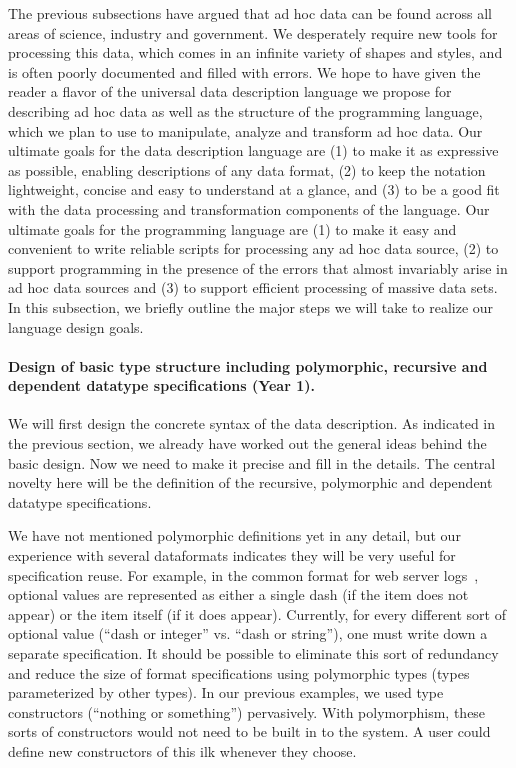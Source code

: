 \documentclass[11pt]{article}
\begin{document}
The previous subsections have argued
that ad hoc data can be found across all areas of science,
industry and government.  We desperately require new tools for processing
this data, which comes in an infinite variety of shapes and styles,
and is often poorly documented and filled with errors.  We hope to
have given the reader a flavor of the
universal data description language we propose for describing
ad hoc data as well as the structure of
the \datatype{} programming language, which we plan to use to
manipulate, analyze and transform ad hoc data.
Our ultimate goals for the data description language are (1) to make it
as expressive as possible, enabling descriptions of
any data format, (2) to keep the notation lightweight, 
concise and easy to understand at a glance, and (3)
to be a good fit with the data processing and
transformation components of the \datatype{} language.
Our ultimate goals for the \datatype{} programming language
are (1) to make it easy and convenient to write reliable
scripts for processing any ad hoc data source, (2)
to support programming in the presence of the errors that
almost invariably arise in ad hoc data sources and (3)
to support efficient processing of massive data sets.
In this subsection, we briefly outline the major steps
we will take to realize our language design goals.

\paragraph*{Design of basic type structure including 
polymorphic, recursive and dependent datatype specifications (Year 1).}
We will first design the concrete syntax of the data description.
As indicated in the previous section, we already have worked
out the general ideas behind the basic design.  Now we need to make 
it precise and fill in the details.  The central novelty
here will be the definition of the recursive, polymorphic
and dependent datatype specifications.

We have not mentioned polymorphic definitions yet in any detail,
but our experience with several dataformats indicates
they will be very useful for specification reuse.  
For example, in the common format for web server logs~\cite{wpp}, optional
values are represented as either a single dash (if the item does not
appear) or the item itself (if it does appear).  Currently, for every
different sort of optional value (\ie ``dash or integer'' vs. ``dash
or string''), one must write down a separate specification.  It should
be possible to eliminate this sort of redundancy and reduce the size
of format specifications using polymorphic types (types parameterized
by other types).  In our previous examples, we used
{} type constructors (``nothing or something'') pervasively.  
With polymorphism,
these sorts of constructors would not need to be built in to the
system.  A user could define new constructors of this ilk 
whenever they choose.
\end{document}
